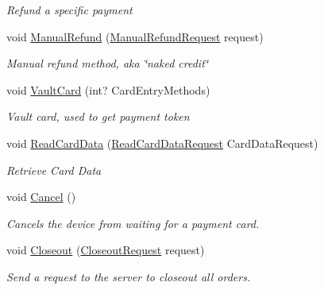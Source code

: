 \begin{DoxyCompactItemize}
\begin{DoxyCompactList}\small\item\em Refund a specific payment \end{DoxyCompactList}\item 
void \hyperlink{interfacecom_1_1clover_1_1remotepay_1_1sdk_1_1_i_clover_connector_a0216263a8b560a29f9c64778e37a136e}{Manual\+Refund} (\hyperlink{classcom_1_1clover_1_1remotepay_1_1sdk_1_1_manual_refund_request}{Manual\+Refund\+Request} request)
\begin{DoxyCompactList}\small\item\em Manual refund method, aka \char`\"{}naked credit\char`\"{} \end{DoxyCompactList}\item 
void \hyperlink{interfacecom_1_1clover_1_1remotepay_1_1sdk_1_1_i_clover_connector_a1d501a736452123be1dd8f42157389e3}{Vault\+Card} (int? Card\+Entry\+Methods)
\begin{DoxyCompactList}\small\item\em Vault card, used to get payment token \end{DoxyCompactList}\item 
void \hyperlink{interfacecom_1_1clover_1_1remotepay_1_1sdk_1_1_i_clover_connector_a841db6225c6a5df5e04918d9e2648fd1}{Read\+Card\+Data} (\hyperlink{classcom_1_1clover_1_1remotepay_1_1sdk_1_1_read_card_data_request}{Read\+Card\+Data\+Request} Card\+Data\+Request)
\begin{DoxyCompactList}\small\item\em Retrieve Card Data \end{DoxyCompactList}\item 
void \hyperlink{interfacecom_1_1clover_1_1remotepay_1_1sdk_1_1_i_clover_connector_abbb999130d903a88e806c7b396c743f7}{Cancel} ()
\begin{DoxyCompactList}\small\item\em Cancels the device from waiting for a payment card. \end{DoxyCompactList}\item 
void \hyperlink{interfacecom_1_1clover_1_1remotepay_1_1sdk_1_1_i_clover_connector_ac4f3cd841d87046f329e98d058f65e55}{Closeout} (\hyperlink{classcom_1_1clover_1_1remotepay_1_1sdk_1_1_closeout_request}{Closeout\+Request} request)
\begin{DoxyCompactList}\small\item\em Send a request to the server to closeout all orders. \end{DoxyCompactList}\item 

\end{DoxyCompactItemize}
